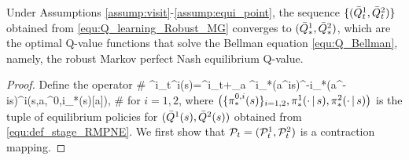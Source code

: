 \begin{theorem}\label{thm:conv_Q}
Under Assumptions \ref{assump:visit}-\ref{assump:equi_point}, the sequence $\{(\bar{Q}^1_t,\bar{Q}^2_t)\}$ obtained from \eqref{equ:Q_learning_Robust_MG} converges to $(\bar{Q}^1_*,\bar{Q}^2_*)$, which are the optimal Q-value functions that solve  the Bellman equation \eqref{equ:Q_Bellman}, namely, the robust Markov perfect Nash equilibrium Q-value.
\end{theorem}
\begin{proof}
	Define the operator 
 	\#\label{equ:def_P_i}
	\cP^i_t\oQ^i(s)=\oR^i_t+\gamma \sum_{a\in\cA} \pi^i_*(a^i\given s)\pi^{-i}_*(a^{-i}\given s)\oQ^i\big(s,a,\pi^{0,i}_*(s)[a]\big),
	\#
	for $i=1,2$, where $\big(\{\pi^{0,i}_*(s)\}_{i=1,2},\pi^1_*(\cdot{\,|\,} s), \pi^2_*(\cdot{\,|\,} s)\big)$ is the tuple of equilibrium policies for $(\bar{Q}^1(s),\bar{Q}^2(s))$ obtained from \eqref{equ:def_stage_RMPNE}. We first show that $\mathcal{P}_t=(\mathcal{P}^1_t,\mathcal{P}^2_t)$ is a contraction mapping. 
	

\end{proof}
